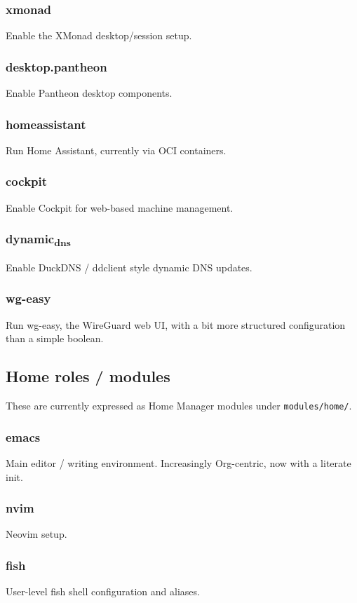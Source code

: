 \documentclass[11pt]{article}
\begin{document}
\subsubsection{xmonad}
\label{sec:org551296f}
Enable the XMonad desktop/session setup.
\subsubsection{desktop.pantheon}
\label{sec:org7d7be0e}
Enable Pantheon desktop components.
\subsubsection{homeassistant}
\label{sec:org906f678}
Run Home Assistant, currently via OCI containers.
\subsubsection{cockpit}
\label{sec:org82ab0c5}
Enable Cockpit for web-based machine management.
\subsubsection{dynamic\textsubscript{dns}}
\label{sec:org460a470}
Enable DuckDNS / ddclient style dynamic DNS updates.
\subsubsection{wg-easy}
\label{sec:org8edcf51}
Run wg-easy, the WireGuard web UI, with a bit more structured configuration
than a simple boolean.
\subsection{Home roles / modules}
\label{sec:org515265d}

These are currently expressed as Home Manager modules under \texttt{modules/home/}.
\subsubsection{emacs}
\label{sec:org8598fd6}
Main editor / writing environment. Increasingly Org-centric, now with a
literate init.
\subsubsection{nvim}
\label{sec:org28c3394}
Neovim setup.
\subsubsection{fish}
\label{sec:org3aeb013}
User-level fish shell configuration and aliases.
\end{document}
